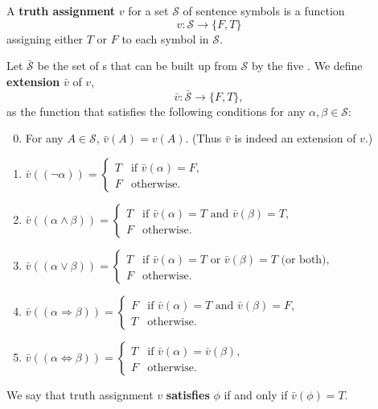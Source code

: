 \documentclass{report}
\begin{document}
\section{}%

  A \textbf{truth assignment} $v$ for a set $\mathcal{S}$ of sentence symbols is
    a function $$v \colon \mathcal{S} \rightarrow \{F, T\}$$ assigning either
    $T$ or $F$ to each symbol in $\mathcal{S}$.

  \suitdivider

  \noindent
  Let $\bar{\mathcal{S}}$ be the set of s that
    can be built up from $\mathcal{S}$ by the five
    .
  We define \textbf{extension} $\bar{v}$ of $v$,
    $$\bar{v} \colon \bar{\mathcal{S}} \rightarrow \{F, T\},$$
    as the function that satisfies the following conditions for any
    $\alpha, \beta \in \mathcal{S}$:
    \begin{enumerate}[(1)]
      \setcounter{enumi}{-1}
      \item For any $A \in \mathcal{S}$, $\bar{v}(A) = v(A)$.
        (Thus $\bar{v}$ is indeed an extension of $v$.)
      \item $\bar{v}((\neg\alpha)) = \begin{cases}
          T & \text{if } \bar{v}(\alpha) = F, \\
          F & \text{otherwise}.
        \end{cases}$
      \item $\bar{v}((\alpha \land \beta)) = \begin{cases}
          T & \text{if } \bar{v}(\alpha) = T \text{ and } \bar{v}(\beta) = T, \\
          F & \text{otherwise}.
        \end{cases}$
      \item $\bar{v}((\alpha \lor \beta)) = \begin{cases}
          T & \text{if } \bar{v}(\alpha) = T \text{ or }
            \bar{v}(\beta) = T \text{ (or both)}, \\
          F & \text{otherwise}.
        \end{cases}$
      \item $\bar{v}((\alpha \Rightarrow \beta)) = \begin{cases}
          F & \text{if } \bar{v}(\alpha) = T \text{ and } \bar{v}(\beta) = F, \\
          T & \text{otherwise}.
        \end{cases}$
      \item $\bar{v}((\alpha \Leftrightarrow \beta)) = \begin{cases}
          T & \text{if } \bar{v}(\alpha) = \bar{v}(\beta), \\
          F & \text{otherwise}.
        \end{cases}$
    \end{enumerate}
  We say that truth assignment $v$ \textbf{satisfies} $\phi$ if and only if
    $\bar{v}(\phi) = T$.
\end{document}
